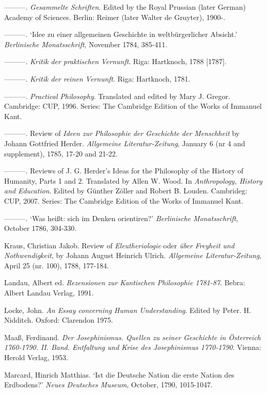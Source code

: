 {---}{---}{---}. \textit{Gesammelte Schriften}. Edited by the Royal Prussian (later German) Academy of Sciences. Berlin: Reimer (later Walter de Gruyter), 1900{-}.

{---}{---}{---}. `Idee zu einer allgemeinen Geschichte in weltb\"{u}rgerlicher Absicht.' \textit{Berlinische Monatsschrift}, November 1784, 385{-}411.

{---}{---}{---}. \textit{Kritik der praktischen Vernunft}. Riga: Hartknoch, 1788 [1787].

{---}{---}{---}. \textit{Kritik der reinen Vernunft}. Riga: Hartknoch, 1781.

{---}{---}{---}. \textit{Practical Philosophy}. Translated and edited by Mary J. Gregor. Cambridge: CUP, 1996. Series: The Cambridge Edition of the Works of Immanuel Kant.

{---}{---}{---}. Review of \textit{Ideen zur Philosophie der Geschichte der Menschheit }by Johann Gottfried Herder. \textit{Allgemeine Literatur{-}Zeitung}, January 6 (nr 4 and supplement), 1785, 17{-}20 and 21{-}22.

{---}{---}{---}. Reviews of J. G. Herder's Ideas for the Philosophy of the History of Humanity, Parts 1 and 2. Translated by Allen W. Wood. In \textit{Anthropology, History and Education}. Edited by G\"{u}nther Z\"{o}ller and Robert B. Louden. Cambrideg: CUP, 2007. Series: The Cambridge Edition of the Works of Immanuel Kant.

{---}{---}{---}. `Was hei\ss{}t: sich im Denken orientiren?' \textit{Berlinische Monatsschrift}, October 1786, 304{-}330.

Kraus, Christian Jakob. Review of \textit{Eleutheriologie }oder\textit{ \"{u}ber Freyheit und Nothwendigkeit}, by Johann August Heinrich Ulrich. \textit{Allgemeine Literatur{-}Zeitung}, April 25 (nr. 100), 1788, 177{-}184.

Landau, Albert ed. \textit{Rezensionen zur Kantischen Philosophie 1781{-}87}. Bebra: Albert Landau Verlag, 1991.

Locke, John. \textit{An Essay concerning Human Understanding}. Edited by Peter. H. Nidditch. Oxford: Clarendon 1975.

Maa\ss{}, Ferdinand. \textit{Der Josephinismus. Quellen zu seiner Geschichte in \"{O}sterreich 1760{-}1790. II. Band. Entfaltung und Krise des Josephinismus 1770{-}1790}. Vienna: Herold Verlag, 1953.

Marcard, Hinrich Matthias. `Ist die Deutsche Nation die erste Nation des Erdbodens?' \textit{Neues Deutsches Museum}, October, 1790, 1015{-}1047.

